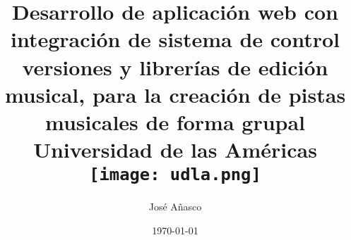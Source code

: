   \title{
    {Desarrollo de aplicación web con integración de sistema de control versiones
    y librerías de edición musical, para la creación de pistas musicales de forma
    grupal}\\
  {\large Universidad de las Américas}\\
    {\texttt{[image: udla.png]}}
  }
  \author{José Añasco}
  \date{\today}
  \maketitle

